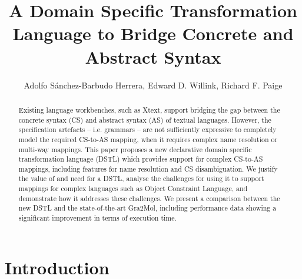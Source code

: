 \documentclass{llncs}
\begin{document}
\title{A Domain Specific Transformation Language to Bridge Concrete and Abstract Syntax}

\author{Adolfo S\'{a}nchez-Barbudo Herrera, Edward D. Willink,
Richard F. Paige}

\maketitle

\begin{abstract}
Existing language workbenches, such as Xtext, support bridging the gap between the concrete syntax (CS) and abstract syntax (AS) of textual languages. However, the specification artefacts -- i.e. grammars -- are not sufficiently expressive to completely model the required CS-to-AS mapping, when it requires complex name resolution or multi-way mappings. This paper proposes a new declarative domain specific transformation language (DSTL) which provides support for complex CS-to-AS mappings, including features for name resolution and CS disambiguation. We justify the value of and need for a DSTL, analyse the challenges for using it to support mappings for complex languages such as Object Constraint Language, and demonstrate how it addresses these challenges. We present a comparison between the new DSTL and the state-of-the-art Gra2Mol, including performance data showing a significant improvement in terms of execution time.

\end{abstract}

\section{Introduction}
\end{document}

